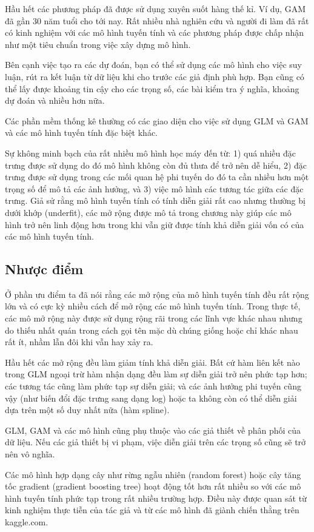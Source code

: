Hầu hết các phương pháp đã được sử dụng xuyên suốt hàng thế kỉ. Ví dụ, GAM đã gần 30 năm tuổi cho tới nay. Rất nhiều nhà nghiên cứu và người đi làm đã rất có kinh nghiệm với các mô hình tuyến tính và các phương pháp được chấp nhận như một tiêu chuẩn trong việc xây dựng mô hình.

Bên cạnh việc tạo ra các dự đoán, bạn có thể sử dụng các mô hình cho việc suy luận, rút ra kết luận từ dữ liệu khi cho trước các giả định phù hợp. Bạn cũng có thể lấy được khoảng tin cậy cho các trọng số, các bài kiểm tra ý nghĩa, khoảng dự đoán và nhiều hơn nữa.

Các phần mềm thống kê thường có các giao diện cho việc sử dụng GLM và GAM và các mô hình tuyến tính đặc biệt khác.

Sự không minh bạch của rất nhiều mô hình học máy đến từ: 1) quá nhiều đặc trưng được sử dụng do đó mô hình không còn đủ thưa để trở nên dễ hiểu, 2) đặc trưng được sử dụng trong các mối quan hệ phi tuyến do đó ta cần nhiều hơn một trọng số để mô tả các ảnh hưởng, và 3) việc mô hình các tương tác giữa các đặc trưng. Giả sử rằng mô hình tuyến tính có tính diễn giải rất cao nhưng thường bị dưới khớp (underfit), các mở rộng được mô tả trong chương này giúp các mô hình trở nên linh động hơn trong khi vẫn giữ được tính khả diễn giải vốn có của các mô hình tuyến tính.

\subsection{Nhược điểm}
Ở phần ưu điểm ta đã nói rằng các mở rộng của mô hình tuyến tính đều rất rộng lớn và có cực kỳ nhiều cách để mở rộng các mô hình tuyến tính. Trong thực tế, các mô mở rộng này được sử dụng rộng rãi trong các lĩnh vực khác nhau nhưng do thiếu nhất quán trong cách gọi tên mặc dù chúng giống hoặc chỉ khác nhau rất ít, nhầm lẫn đôi khi vẫn hay xảy ra.

Hầu hết các mở rộng đều làm giảm tính khả diễn giải. Bất cứ hàm liên kết nào trong GLM ngoại trừ hàm nhận dạng đều làm sự diễn giải trở nên phức tạp hơn; các tương tác cũng làm phức tạp sự diễn giải; và các ảnh hưởng phi tuyến cũng vậy (như biến đổi đặc trưng sang dạng log) hoặc ta không còn có thể diễn giải dựa trên một số duy nhất nữa (hàm spline).

GLM, GAM và các mô hình cũng phụ thuộc vào các giả thiết về phân phối của dữ liệu. Nếu các giả thiết bị vi phạm, việc diễn giải trên các trọng số cũng sẽ trở nên vô nghĩa.

Các mô hình hợp dạng cây như rừng ngẫu nhiên (random forest) hoặc cây tăng tốc gradient (gradient boosting tree) hoạt động tốt hơn rất nhiều so với các mô hình tuyến tính phức tạp trong rất nhiều trường hợp. Điều này được quan sát từ kinh nghiệm thực tiễn của tác giả và từ các mô hình đã giành chiến thằng trên kaggle.com.

